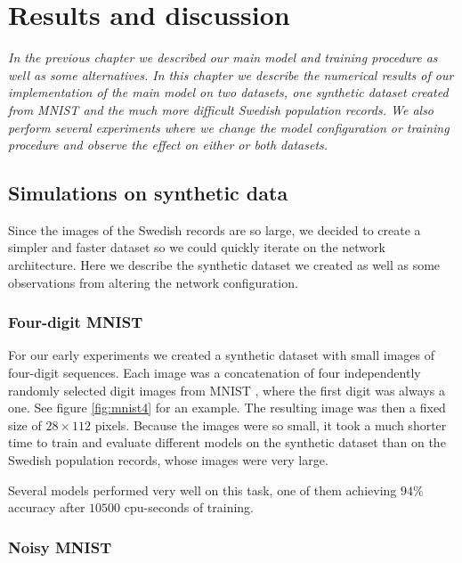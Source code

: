 \chapter{Results and discussion}

\textit{
In the previous chapter we described our main model and training procedure as well as some alternatives.
In this chapter we describe the numerical results of our implementation of the main model on two datasets, one synthetic dataset created from MNIST and the much more difficult Swedish population records. We also perform several experiments where we change the model configuration or training procedure and observe the effect on either or both datasets. }

\section{Simulations on synthetic data}

Since the images of the Swedish records are so large, we decided to create a simpler and faster dataset so we could quickly iterate on the network architecture. Here we describe the synthetic dataset we created as well as some observations from altering the network configuration.

\subsection{Four-digit MNIST} \label{ssec:pretrain}



For our early experiments we created a synthetic dataset with small images of four-digit sequences.
Each image was a concatenation of four independently randomly selected digit images from MNIST \cite{MNIST_orig}, where the first digit was always a one. See figure \ref{fig:mnist4} for an example. The resulting image was then a fixed size of $28 \times 112$ pixels.
Because the images were so small, it took a much shorter time to train and evaluate different models on the synthetic dataset than on the Swedish population records, whose images were very large.

Several models performed very well on this task, one of them achieving $94\%$ accuracy after $10500$ cpu-seconds of training.

\subsection{Noisy MNIST}

